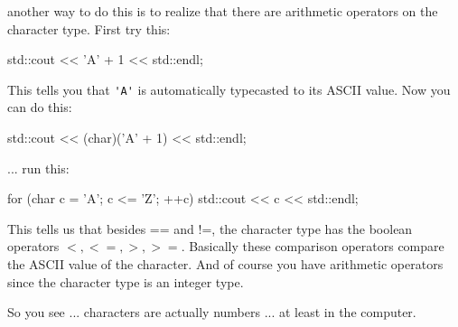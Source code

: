 
 another way to do this is to realize that there are arithmetic operators on the character type. First try this:

\begin{consolethree}[escapeinside=||]
std::cout << 'A' + 1 << std::endl;
\end{consolethree}

This tells you that \verb!'A'! is automatically typecasted to its ASCII value. Now you can do this:

\begin{consolethree}[escapeinside=||]
std::cout << (char)('A' + 1) << std::endl;
\end{consolethree}

 ... run this:

\begin{consolethree}[escapeinside=||]
for (char c = 'A'; c <= 'Z'; ++c)
{
    std::cout << c << std::endl;
}
\end{consolethree}

This tells us that besides == and !=, the character type has the boolean operators $<, <=, >, >=$. Basically these comparison operators compare the ASCII value of the character. And of course you have arithmetic operators since the character type is an integer type.

So you see ... characters are actually numbers ... at least in the computer.


